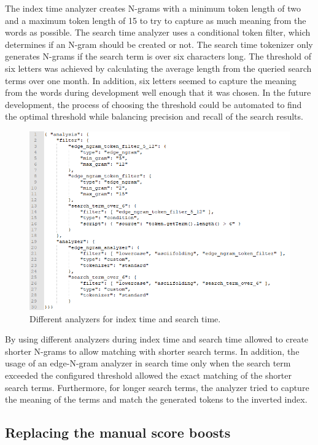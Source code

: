 The index time analyzer creates N-grams with a minimum token length of two and a maximum token length of 15 to try
to capture as much meaning from the words as possible.
The search time analyzer uses a conditional token filter, which determines if an N-gram should be created or not.
The search time tokenizer only generates N-grams if the search term is over six characters long.
The threshold of six letters was achieved by calculating the average length from the queried search terms over one month.
In addition, six letters seemed to capture the meaning from the words during development well enough that it was chosen.
In the future development, the process of choosing the threshold could be automated to find the optimal threshold
while balancing precision and recall of the search results.

\begin{figure}
    \centering
    \includegraphics[width=\textwidth]{img/new-analyzer.png}
    \caption{Different analyzers for index time and search time.}
    \label{fig:new-analyzer}
\end{figure}

By using different analyzers during index time and search time allowed to create shorter N-grams to allow
matching with shorter search terms. 
In addition, the usage of an edge-N-gram analyzer in search time only when the search term exceeded the configured
threshold allowed the exact matching of the shorter search terms.
Furthermore, for longer search terms, the analyzer tried to capture the meaning of the terms and 
match the generated tokens to the inverted index.


\subsection{Replacing the manual score boosts}


